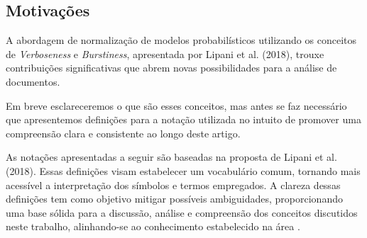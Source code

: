\documentclass[12pt]{article}
\begin{document}
\subsection{Motivações}
A abordagem de normalização de modelos probabilísticos utilizando os conceitos de \textit{Verboseness} e \textit{Burstiness}, apresentada por Lipani et al. (2018), trouxe contribuições significativas que abrem novas possibilidades para a análise de documentos.

Em breve esclareceremos o que são esses conceitos, mas antes se faz necessário que apresentemos definições para a notação utilizada no intuito de promover uma compreensão clara e consistente ao longo deste artigo.

As notações apresentadas a seguir são baseadas na proposta de Lipani et al. (2018). Essas definições visam estabelecer um vocabulário comum, tornando mais acessível a interpretação dos símbolos e termos empregados. A clareza dessas definições tem como objetivo mitigar possíveis ambiguidades, proporcionando uma base sólida para a discussão, análise e compreensão dos conceitos discutidos neste trabalho, alinhando-se ao conhecimento estabelecido na área \cite{Lipani2018}.
\end{document}
